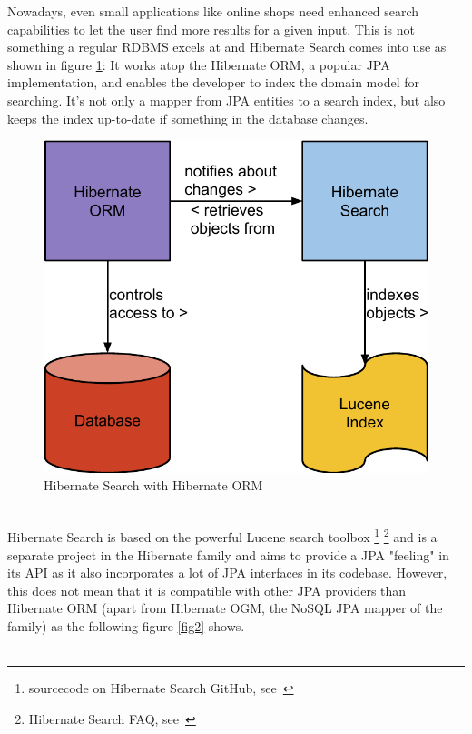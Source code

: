 \pagebreak
\noindent
Nowadays, even small applications like online shops need enhanced search capabilities to let the user find more results for a given input.
This is not something a regular RDBMS excels at and Hibernate Search comes into use as shown in figure \ref{fig1}: It works atop the Hibernate ORM, a popular JPA implementation, and enables the developer to index the domain model for searching. It's not only a mapper from JPA entities to a search index, but also keeps the index up-to-date if something in the database changes.
\\
\begin{figure}[ht]
	\centering
	\includegraphics[scale=0.45]{images/hibernate_search_hibernate_schema.pdf}
	\caption{Hibernate Search with Hibernate ORM}
	\label{fig1}
\end{figure}
\\
Hibernate Search is based on the powerful Lucene search toolbox \footnote{sourcecode on Hibernate Search GitHub, see~\cite{hsearch_source_code_git}} \footnote{Hibernate Search FAQ, see~\cite{hibernate_search_faq}} and is a separate project in the Hibernate family and aims to provide a JPA "feeling" in its API as it also incorporates a lot of JPA interfaces in its codebase. However, this does not mean that it is compatible with other JPA providers than Hibernate ORM (apart from Hibernate OGM, the NoSQL JPA mapper of the family) as the following figure \ref{fig2} shows.
\\\\
